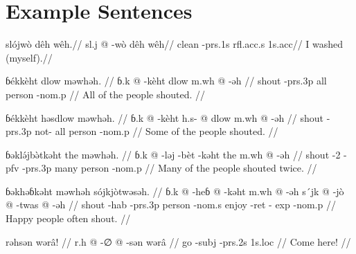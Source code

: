 \section{Example Sentences}

\ex
\begingl
\glpreamble slójwò dêh wêh.//
\gla sl.j @ -wò dêh wêh//
\glb clean -{\sc prs}.1s {\sc rfl}.{\sc acc}.s 1s.{\sc acc}//
\glft I washed (myself).//
\endgl
\xe

\pex
\a
\begingl
\glpreamble ɓékkèht dlow məwhəh. //
\gla ɓ.k @ -kèht dlow m.wh @ -əh //
\glb shout -{\sc prs}.3p all person -{\sc nom}.p //
\glft All of the people shouted. //
\endgl

\a
\begingl
\glpreamble ɓékkèht həsdlow məwhəh. //
\gla ɓ.k @ -kèht h.s- @ dlow m.wh @ -əh //
\glb shout -{\sc prs}.3p not- all person -{\sc nom}.p //
\glft Some of the people shouted. //
\endgl

\a
\begingl
\glpreamble ɓəklə́jbə̀tkəht the məwhəh. //
\gla ɓ.k @ -ləj -bèt -kəht the m.wh @ -əh //
\glb shout -2 -{\sc pfv} -{\sc prs}.3p many person -{\sc nom}.p //
\glft Many of the people shouted twice. //
\endgl

\a
\begingl
\glpreamble ɓəkhəɓkəht məwhəh sójkjòtwəsəh. //
\gla ɓ.k @ -heɓ @ -kəht m.wh @ -əh s´jk @ -jò @ -twas @ -əh //
\glb shout -{\sc hab} -{\sc prs}.3p person -{\sc nom}.s enjoy -{\sc ret} -{\sc
exp} -{\sc nom}.p //
\glft Happy people often shout. //
\endgl
\xe

\ex
\begingl
\glpreamble rəhsən wərâ! //
\gla r.h @ -∅ @ -sən wərâ //
\glb go -{\sc subj} -{\sc prs}.2s 1s.{\sc loc} //
\glft Come here! //
\endgl
\xe
